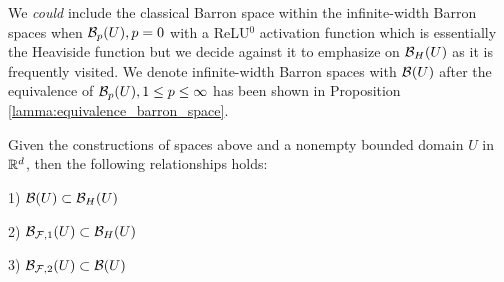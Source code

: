 We \textit{could} include the classical Barron space within the infinite-width
Barron spaces when $\mathcal{B}_{p}(U), p=0$ with a ReLU$^0$ activation function
which is essentially the Heaviside function but we decide against it to
emphasize on $\mathcal{B}_{H}(U)$ as it is frequently visited. We denote
infinite-width Barron spaces with $\mathcal{B}_{}(U)$ after the equivalence of
$\mathcal{B}_{p}(U), 1\leq p \leq\infty$ has been shown in Proposition
\ref{lamma:equivalence_barron_space}.

\begin{lemma}
    Given the constructions of spaces above and a nonempty bounded domain $U$ in
    $\mathbb{R}^d$, then the following relationships holds:

    1) $\mathcal{B}(U) \subset \mathcal{B}_{H}(U)$

    2) $\mathcal{B}_{\mathcal{F}, 1}(U) \subset \mathcal{B}_{H}(U)$

    3) $\mathcal{B}_{\mathcal{F}, 2}(U) \subset \mathcal{B}(U)$
\end{lemma}


